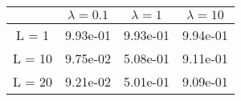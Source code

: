 \begin{tabular}{cccc}
& $\lambda = 0.1$ & $\lambda = 1$ & $\lambda = 10$ \\
\hline
L = 1 & 9.93e-01 & 9.93e-01 & 9.94e-01 \\
L = 10 & 9.75e-02 & 5.08e-01 & 9.11e-01 \\
L = 20 & 9.21e-02 & 5.01e-01 & 9.09e-01 \\
\hline
\end{tabular}

